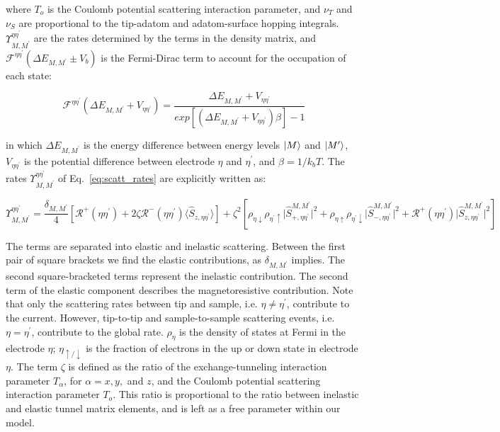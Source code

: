 \documentclass[reprint,amsmath,amssymb,aps,nofootinbib,onecolumn]{revtex4-2}
\begin{document}
where $T_{o}$ is the Coulomb potential scattering interaction parameter, and $\nu_T$ and $\nu_S$ are proportional to the tip-adatom and adatom-surface hopping integrals. 
$\Upsilon^{\eta\eta^{\prime}}_{M,M^{\prime}}$ are the rates determined by the terms in the density matrix, and $\mathcal{F}^{\eta\eta^{\prime}}(\Delta E_{M,M^{\prime}}\pm V_b )$ is the Fermi-Dirac term to account for the occupation of each state:

\begin{equation}
\mathcal{F}^{\eta\eta^{\prime}}(\Delta E_{M,M^{\prime}}+ V_{\eta \eta^{\prime}} )=\dfrac{\Delta E_{M,M^{\prime}}+ V_{\eta \eta^{\prime}}}{exp\left[\left( \Delta E_{M,M^{\prime}}+ V_{\eta \eta^{\prime}}  \right)\beta\right]-1}
\label{eq:fermi_conv}
\end{equation}

in which $\Delta E_{M,M^{\prime}}$ is the energy difference between energy levels $\ket{M}$ and $\ket{M^{\prime}}$, $V_{\eta \eta^{\prime}}$ is the potential difference between electrode $\eta$ and $\eta^{\prime}$, and $\beta=1/k_b T$. The rates $\Upsilon^{\eta\eta^{\prime}}_{M,M^{\prime}}$ of Eq.~\ref{eq:scatt_rates} are explicitly written as:

\begin{equation}
\label{eq:ups} 
    \Upsilon^{\eta\eta^{\prime}}_{M,M^{\prime}}=\dfrac{\delta_{M,M^{\prime}}}{4}\left[  \mathcal{R}^{+}(\eta\eta^{\prime})+ 2\zeta \mathcal{R}^{-}(\eta\eta^{\prime})\langle \hat{S}_{z,\eta\eta^{\prime}} \rangle \right] + \zeta^{2}\left[ \rho_{\eta \downarrow} \rho_{\eta^{\prime}\uparrow} \lvert \hat{S}_{+,\eta\eta^{\prime}}^{M,M^{\prime}}\rvert^{2} + \rho_{\eta \uparrow} \rho_{\eta^{\prime}\downarrow} \lvert {\hat{S}_{-,\eta\eta^{\prime}}^{M,M^{\prime}}}\rvert^{2} +\mathcal{R}^{+}(\eta\eta^{\prime})\lvert \hat{S}_{z,\eta\eta^{\prime}}^{M,M^{\prime}}\rvert^{2} \right]
\end{equation}

The terms are separated into elastic and inelastic scattering. Between the first pair of square brackets we find the elastic contributions, as $\delta_{M,M^{\prime}}$ implies. The second square-bracketed terms represent the inelastic contribution.
The second term of the elastic component describes the magnetoresistive contribution. Note that only the scattering rates between tip and sample, i.e. $\eta\neq\eta^{\prime}$, contribute to the current. However, tip-to-tip and sample-to-sample scattering events, i.e. $\eta=\eta^{\prime}$, contribute to the global rate. $\rho_{\eta}$ is the density of states at Fermi in the electrode $\eta$; $\eta_{\uparrow / \downarrow}$ is the fraction of electrons in the up or down state in electrode $\eta$. The term $\zeta$ is defined as the ratio of the exchange-tunneling interaction parameter $T_{\alpha}$, for $\alpha = x, y,$ and $z$, and the Coulomb potential scattering interaction parameter $T_{o}$. This ratio is proportional to the ratio between inelastic and elastic tunnel matrix elements, and is left as a free parameter within our model. 
\end{document}
